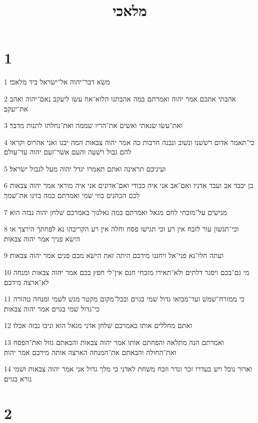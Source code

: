 

\title{מלאכי}


\chapter{1}

\par 1 משׂא דבר־יהוה אל־ישׂראל ביד מלאכי׃
\par 2 אהבתי אתכם אמר יהוה ואמרתם במה אהבתנו הלוא־אח עשׂו ליעקב נאם־יהוה ואהב את־יעקב׃
\par 3 ואת־עשׂו שׂנאתי ואשׂים את־הריו שׁממה ואת־נחלתו לתנות מדבר׃
\par 4 כי־תאמר אדום רשׁשׁנו ונשׁוב ונבנה חרבות כה אמר יהוה צבאות המה יבנו ואני אהרוס וקראו להם גבול רשׁעה והעם אשׁר־זעם יהוה עד־עולם׃
\par 5 ועיניכם תראינה ואתם תאמרו יגדל יהוה מעל לגבול ישׂראל׃
\par 6 בן יכבד אב ועבד אדניו ואם־אב אני איה כבודי ואם־אדונים אני איה מוראי אמר יהוה צבאות לכם הכהנים בוזי שׁמי ואמרתם במה בזינו את־שׁמך׃
\par 7 מגישׁים על־מזבחי לחם מגאל ואמרתם במה גאלנוך באמרכם שׁלחן יהוה נבזה הוא׃
\par 8 וכי־תגשׁון עור לזבח אין רע וכי תגישׁו פסח וחלה אין רע הקריבהו נא לפחתך הירצך או הישׂא פניך אמר יהוה צבאות׃
\par 9 ועתה חלו־נא פני־אל ויחננו מידכם היתה זאת הישׂא מכם פנים אמר יהוה צבאות׃
\par 10 מי גם־בכם ויסגר דלתים ולא־תאירו מזבחי חנם אין־לי חפץ בכם אמר יהוה צבאות ומנחה לא־ארצה מידכם׃
\par 11 כי ממזרח־שׁמשׁ ועד־מבואו גדול שׁמי בגוים ובכל־מקום מקטר מגשׁ לשׁמי ומנחה טהורה כי־גדול שׁמי בגוים אמר יהוה צבאות׃
\par 12 ואתם מחללים אותו באמרכם שׁלחן אדני מגאל הוא וניבו נבזה אכלו׃
\par 13 ואמרתם הנה מתלאה והפחתם אותו אמר יהוה צבאות והבאתם גזול ואת־הפסח ואת־החולה והבאתם את־המנחה הארצה אותה מידכם אמר יהוה׃
\par 14 וארור נוכל וישׁ בעדרו זכר ונדר וזבח משׁחת לאדני כי מלך גדול אני אמר יהוה צבאות ושׁמי נורא בגוים׃

\chapter{2}

